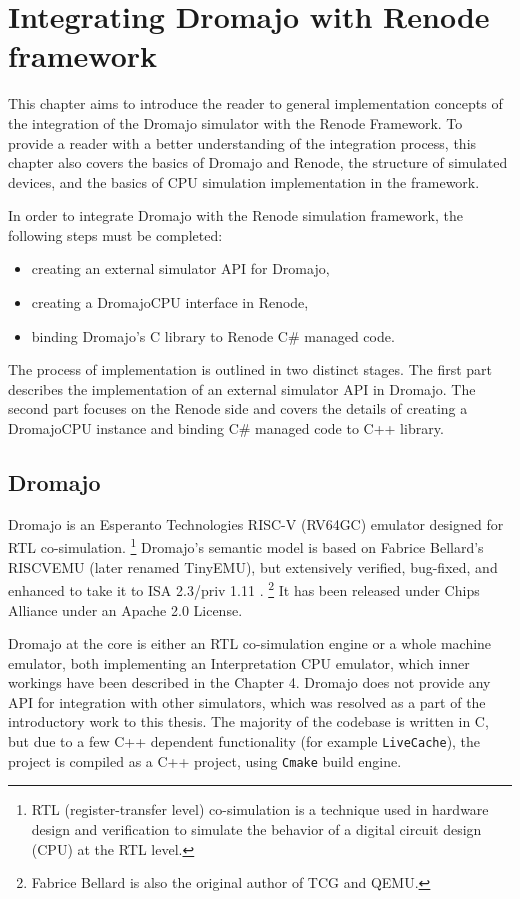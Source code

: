 
\chapter{Integrating Dromajo with Renode framework}

This chapter aims to introduce the reader to general implementation concepts of the integration of the Dromajo simulator with the Renode Framework.
To provide a reader with a better understanding of the integration process, this chapter also covers
the basics of Dromajo and Renode, the structure of simulated devices, and the basics of CPU simulation
implementation in the framework.

In order to integrate Dromajo with the Renode simulation framework, the following steps must be completed:
\begin{itemize}
    \item{creating an external simulator API for Dromajo,}
    \item{creating a DromajoCPU interface in Renode,}
    \item{binding Dromajo's C library to Renode C\# managed code.}
\end{itemize}

\noindent
The process of implementation is outlined in two distinct stages. The first part describes the implementation of an
external simulator API in Dromajo. The second part focuses on the Renode side and covers the details of creating a
DromajoCPU instance and binding C\# managed code to C++ library.

\section{Dromajo}

Dromajo is an Esperanto Technologies RISC-V (RV64GC) emulator designed for RTL co-simulation.%
\footnote{RTL (register-transfer level) co-simulation is a technique used in hardware design and verification to
simulate the behavior of a digital circuit design (CPU) at the RTL level.}
Dromajo's semantic model is based on Fabrice Bellard's RISCVEMU (later renamed TinyEMU), but extensively verified,
bug-fixed, and enhanced to take it to ISA 2.3/priv 1.11 \cite{Dromajo}.
\footnote{Fabrice Bellard is also the original author of TCG and QEMU.}
It has been released under Chips Alliance
\cite{ChipsAlliance} under an Apache 2.0 License.

Dromajo at the core is either an RTL co-simulation engine or a whole machine emulator, both implementing an
Interpretation CPU emulator, which inner workings have been described in the Chapter 4. Dromajo does not provide any API
for integration with other simulators, which was resolved as a part of the introductory work to this thesis. The majority of the
codebase is written in C, but due to a few C++ dependent functionality (for example \texttt{LiveCache}), the project is
compiled as a C++ project, using \texttt{Cmake} build engine.

